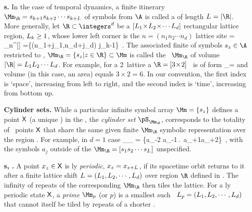 {\bf {\Brick s}.} In the case of temporal dynamics, a finite itinerary
\\
$\Mm_{\R}={\Ssym{k+1}\Ssym{k+2}\cdots\Ssym{k+\speriod{}}}$ of symbols from
$\A$ is called a {\em \brick} of length $\speriod{}=\cl{\R}$. More generally, let
$\R\subset\integers^d$  be a
$[{L_{1}}\!\times\!{L_{2}}\!\times\!\cdots{\ensuremath{L_{d}}}]$ rectangular lattice region,
${L_{k}}\geq1$,
whose lower left corner is the $n=(n_{1}n_{2}\cdots{n_{d}})$ lattice site
\beq
  \R = \R_{n}^{[\!\times\!\!\times\!\cdots{}]}
  =\{(n_1+j_1,\cdots n_d+j_d) \leq j_k\leq {}-1\}
\,.
The associated finite {\brick} of symbols $\Ssym{z}\in\A$ restricted to  \R,
\(
\Mm_{\R}=\{\Ssym{z}| z\in \R \} \subset \Mm
\)
is called the \brick\ $\Mm_{\R}$ of volume
$\cl{\R} = \speriod{1}\speriod{2}\cdots\speriod{d}$. For example, for a 2\dmn\ lattice
a
$\R = [3\!\times\!2]$ \brick\ is of form
\beq
\Mm_{\R}=
and volume (in this case, an area) equals $3\times 2 = 6$.
In our convention, the first index is `space', increasing from left to right,
and the second index is `time', increasing from bottom up.

{\bf Cylinder sets.}
While a particular {\admissible} infinite symbol array
\(
\Mm= \{\Ssym{z}\} %
\)
defines a point $\mathsf{X}$ (a unique {\lattstate}) in the \statesp,
the \emph{cylinder set}
$\pS_{\Mm_{\R}}$,
corresponds to the totality  of
\statesp\ points $\mathsf{X}$ that share the same given finite {\brick} $\Mm_{\R}$
symbolic representation over the region \R. For example, in $d=1$ case
\beq
\pS_{\Mm_{\R}} =
    \{\cdots a_{-2} a_{-1}\,.\,
   \cdots \Ssym{\speriod{}}
   a_{\speriod{}+1}a_{\speriod{}+2}\cdots\}
\,,
with the symbols  $a_{j}$ outside of the {\brick}
$\Mm_{\R}=[\Ssym{1}\Ssym{2}\cdots \Ssym{\speriod{}}]$
unspecified.

{\bf \Po s, \dtors.}
A {\statesp} point $x_z\in\mathsf{X}$ is {\spt}ly
{\em periodic}, $x_z=x_{z+{L_{}}}$, if its spacetime orbit returns to it
after a finite lattice shift
\(
{L_{}}= ({L_{1}},{L_{2}},\cdots,{L_{d}})
\)
over region $\R$ defined in .
The infinity of repeats of the corresponding {\brick} $\Mm_{\R}$ then tiles the lattice.
For a {\spt}ly {periodic} state $\mathsf{X}$, a {\em prime} {\brick}
$\Mm_{p}$ (or $p$) is a smallest such \brick\
\(
{L_{p}}= ({L_{1}},{L_{2}},\cdots,{L_{d}})
\)
that cannot itself be tiled by repeats of a shorter {\brick}.

